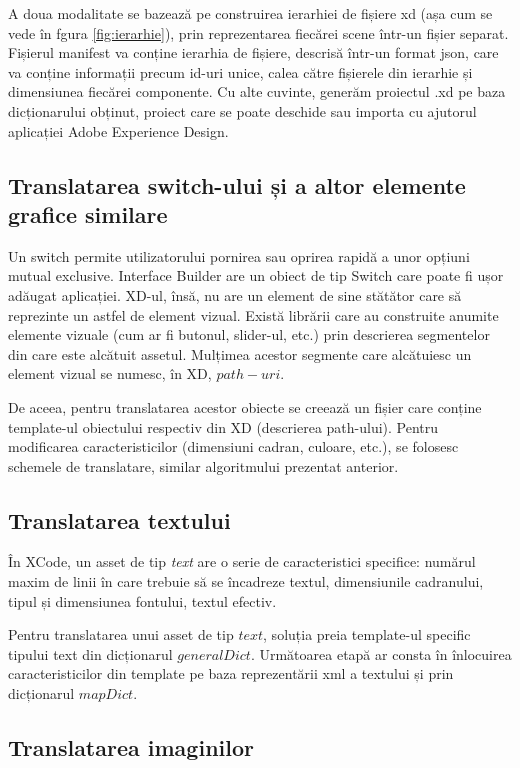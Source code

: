 A doua modalitate se bazează pe construirea ierarhiei de fișiere xd (așa cum se vede în fgura \ref{fig:ierarhie}), prin reprezentarea fiecărei scene într-un fișier separat. Fișierul manifest va conține ierarhia de fișiere, descrisă într-un format json, care va conține informații precum id-uri unice, calea către fișierele din ierarhie și dimensiunea fiecărei componente. Cu alte cuvinte, generăm proiectul .xd pe baza dicționarului obținut, proiect care se poate deschide sau importa cu ajutorul aplicației Adobe Experience Design.

\subsection{Translatarea switch-ului și a altor elemente grafice similare}

Un switch permite utilizatorului pornirea sau oprirea rapidă a unor opțiuni mutual exclusive. 
Interface Builder are un obiect de tip Switch care poate fi ușor adăugat aplicației. XD-ul, însă, nu are un element de sine stătător care să reprezinte un astfel de element vizual. Există librării care au construite anumite elemente vizuale (cum ar fi butonul, slider-ul, etc.) prin descrierea segmentelor din care este alcătuit assetul. Mulțimea acestor segmente care alcătuiesc un element vizual se numesc, în XD, $path-uri$.

De aceea, pentru translatarea acestor obiecte se creează un fișier care conține template-ul obiectului respectiv din XD (descrierea path-ului). Pentru modificarea caracteristicilor (dimensiuni cadran, culoare, etc.), se folosesc schemele de translatare, similar algoritmului prezentat anterior.
\subsection{Translatarea textului}

În XCode, un asset de tip \textit{text} are o serie de caracteristici specifice: numărul maxim de linii în care trebuie să se încadreze textul, dimensiunile cadranului, tipul și dimensiunea fontului, textul efectiv. 

Pentru translatarea unui asset de tip $text$, soluția preia template-ul specific tipului text din dicționarul $generalDict$. Următoarea etapă ar consta în înlocuirea caracteristicilor din template pe baza reprezentării xml a textului și prin dicționarul $mapDict$. 

\subsection{Translatarea imaginilor}

